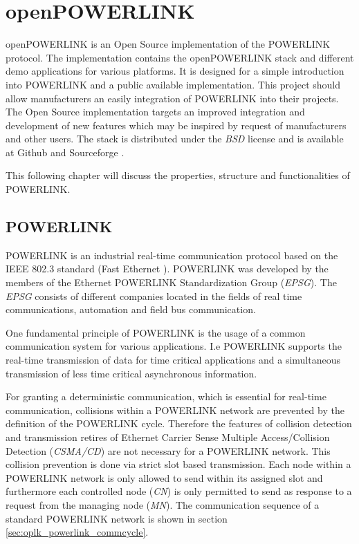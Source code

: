 \chapter{openPOWERLINK}
\label{cha:oplk}
openPOWERLINK is an Open Source implementation of the POWERLINK protocol.
The implementation contains the openPOWERLINK stack and different demo applications for various platforms.
It is designed for a simple introduction into POWERLINK and a public available implementation.
This project should allow manufacturers an easily integration of POWERLINK into their projects.
The Open Source implementation targets an improved integration and development of new features which may be inspired by request of manufacturers and other users.
The stack is distributed under the \emph{BSD} license and is available at Github \cite{openpowerlink_github} and Sourceforge \cite{openpowerlink_sourceforge}.

This following chapter will discuss the properties, structure and functionalities of POWERLINK.

\section{POWERLINK}
\label{sec:oplk_powerlink}
POWERLINK is an industrial real-time communication protocol based on the IEEE 802.3 standard (Fast Ethernet \cite{ethernet_ieee_2016}).
POWERLINK was developed by the members of the Ethernet POWERLINK Standardization Group (\emph{EPSG}).
The \emph{EPSG} consists of different companies located in the fields of real time communications, automation and field bus communication. \cite{epsg_hp}

One fundamental principle of POWERLINK is the usage of a common communication system for various applications.
I.e POWERLINK supports the real-time transmission of data for time critical applications and a simultaneous transmission of less time critical asynchronous information.

For granting a deterministic communication, which is essential for real-time communication, collisions within a POWERLINK network are prevented by the definition of the POWERLINK cycle.
Therefore the features of collision detection and transmission retires of Ethernet Carrier Sense Multiple Access/Collision Detection (\emph{CSMA/CD}) are not necessary for a POWERLINK network. \cite[section 4.2]{ethernet_ieee_2016}
This collision prevention is done via strict slot based transmission.
Each node within a POWERLINK network is only allowed to send within its assigned slot and furthermore each controlled node (\emph{CN}) is only permitted to send as response to a request from the managing node (\emph{MN}). \cite[chapter 1]{epsg_epsg_2013}
The communication sequence of a standard POWERLINK network is shown in section \ref{sec:oplk_powerlink_commcycle}.

